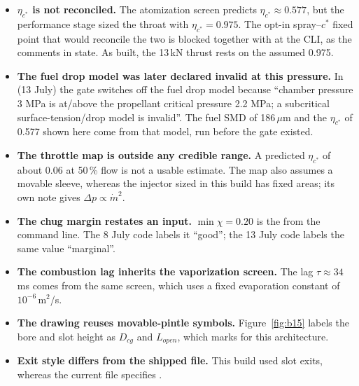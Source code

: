 

\begin{itemize}
\item \textbf{$\eta_{c^*}$ is not reconciled.} The atomization screen predicts $\eta_{c^*} \approx 0.577$, but the performance stage sized the throat with $\eta_{c^*} = 0.975$. The opt-in spray--$c^*$ fixed point that would reconcile the two is blocked together with  at the CLI, as the comments in  state. As built, the 13\,kN thrust rests on the assumed 0.975.
\item \textbf{The fuel drop model was later declared invalid at this pressure.} In  (13 July) the gate  switches off the fuel drop model because ``chamber pressure 3 MPa is at/above the propellant critical pressure 2.2 MPa; a subcritical surface-tension/drop model is invalid''. The fuel SMD of 186\,$\mu$m and the $\eta_{c^*}$ of 0.577 shown here come from that model, run before the gate existed.
\item \textbf{The throttle map is outside any credible range.} A predicted $\eta_{c^*}$ of about 0.06 at 50\,\% flow is not a usable estimate. The map also assumes a movable sleeve, whereas the injector sized in this build has fixed areas; its own  note gives $\Delta p \propto \dot m^2$.
\item \textbf{The chug margin restates an input.} $\min\chi = 0.20$ is the   from the command line. The 8 July code labels it ``good''; the 13 July code labels the same value ``marginal''.
\item \textbf{The combustion lag inherits the vaporization screen.} The lag $\tau \approx 34$\,ms comes from the same screen, which uses a fixed evaporation constant of $10^{-6}$\,m$^2$/s.
\item \textbf{The drawing reuses movable-pintle symbols.} Figure~\ref{fig:b15} labels the bore and slot height as $D_{cg}$ and $L_{open}$, which  marks  for this architecture.
\item \textbf{Exit style differs from the shipped file.} This build used slot exits, whereas the current  file specifies  .
\end{itemize}

